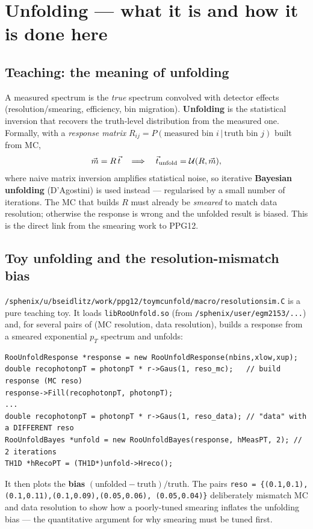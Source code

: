 \documentclass[11pt]{article}
\newcommand{\pp}[1]{\textcolor{pathcol}{\texttt{#1}}}
\begin{document}
\section{Unfolding --- what it is and how it is done here}

\subsection{Teaching: the meaning of unfolding}
A measured spectrum is the \emph{true} spectrum convolved with detector effects
(resolution/smearing, efficiency, bin migration). \textbf{Unfolding} is the
statistical inversion that recovers the truth-level distribution from the
measured one. Formally, with a \emph{response matrix} $R_{ij}=P(\text{measured
bin }i\,|\,\text{truth bin }j)$ built from MC,
\[
  \vec{m}=R\,\vec{t}\quad\Longrightarrow\quad
  \vec{t}_{\rm unfold}=\mathcal{U}(R,\vec{m}),
\]
where naive matrix inversion amplifies statistical noise, so iterative
\textbf{Bayesian unfolding} (D'Agostini) is used instead --- regularised by a
small number of iterations. The MC that builds $R$ must already be
\emph{smeared} to match data resolution; otherwise the response is wrong and
the unfolded result is biased. This is the direct link from the smearing work
to PPG12.

\subsection{Toy unfolding and the resolution-mismatch bias}
\pp{/sphenix/u/bseidlitz/work/ppg12/toymcunfold/macro/resolutionsim.C}
is a pure teaching toy. It loads \texttt{libRooUnfold.so} (from
\texttt{/sphenix/user/egm2153/...}) and, for several pairs of
(MC resolution, data resolution), builds a response from a smeared exponential
$p_T$ spectrum and unfolds:
\begin{lstlisting}
RooUnfoldResponse *response = new RooUnfoldResponse(nbins,xlow,xup);
double recophotonpT = photonpT * r->Gaus(1, reso_mc);   // build response (MC reso)
response->Fill(recophotonpT, photonpT);
...
double recophotonpT = photonpT * r->Gaus(1, reso_data); // "data" with a DIFFERENT reso
RooUnfoldBayes *unfold = new RooUnfoldBayes(response, hMeasPT, 2); // 2 iterations
TH1D *hRecoPT = (TH1D*)unfold->Hreco();
\end{lstlisting}
It then plots the \textbf{bias} $(\text{unfolded}-\text{truth})/\text{truth}$.
The pairs \texttt{reso = \{(0.1,0.1),(0.1,0.11),(0.1,0.09),(0.05,0.06),
(0.05,0.04)\}} deliberately mismatch MC and data resolution to show how a
poorly-tuned smearing inflates the unfolding bias --- the quantitative argument
for why smearing must be tuned first.
\end{document}
